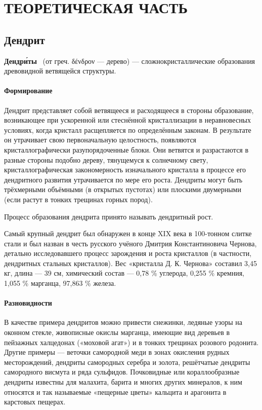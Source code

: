 \chapter{\label{ch:ch01}ТЕОРЕТИЧЕСКАЯ ЧАСТЬ} %

\section{Дендрит}
\textbf{Дендри́ты}~\cite{wikiDen} (от греч. δένδρον — дерево) — сложнокристаллические образования древовидной ветвящейся структуры.
\subsubsection{Формирование} %
Дендрит представляет собой ветвящееся и расходящееся в стороны образование, возникающее при ускоренной или стеснённой кристаллизации в неравновесных условиях, когда кристалл расщепляется по определённым законам. В результате он утрачивает свою первоначальную целостность, появляются кристаллографически разупорядоченные блоки. Они ветвятся и разрастаются в разные стороны подобно дереву, тянущемуся к солнечному свету, кристаллографическая закономерность изначального кристалла в процессе его дендритного развития утрачивается по мере его роста. Дендриты могут быть трёхмерными объёмными (в открытых пустотах) или плоскими двумерными (если растут в тонких трещинах горных пород).

Процесс образования дендрита принято называть дендритный рост.

Самый крупный дендрит был обнаружен в конце XIX века в 100-тонном слитке стали и был назван в честь русского учёного Дмитрия Константиновича Чернова, детально исследовавшего процесс зарождения и роста кристаллов (в частности, дендритных стальных кристаллов). Вес «кристалла Д. К. Чернова» составил 3,45 кг, длина — 39 см, химический состав — 0,78 \% углерода, 0,255 \% кремния, 1,055 \% марганца, 97,863 \% железа.
\subsubsection{Разновидности}
В качестве примера дендритов можно привести снежинки, ледяные узоры на оконном стекле, живописные окислы марганца, имеющие вид деревьев в пейзажных халцедонах («моховой агат») и в тонких трещинах розового родонита. Другие примеры — веточки самородной меди в зонах окисления рудных месторождений, дендриты самородных серебра и золота, решётчатые дендриты самородного висмута и ряда сульфидов. Почковидные или кораллообразные дендриты известны для малахита, барита и многих других минералов, к ним относятся и так называемые «пещерные цветы» кальцита и арагонита в карстовых пещерах.

